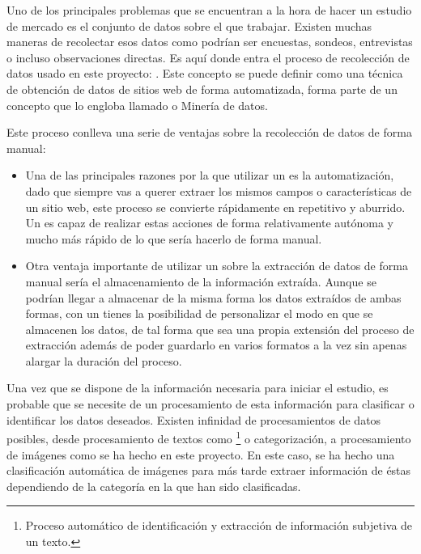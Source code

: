 
Uno de los principales problemas que se encuentran a la hora de hacer un estudio de mercado es el conjunto de datos sobre el que trabajar. Existen muchas maneras de recolectar esos datos como podrían ser encuestas, sondeos, entrevistas o incluso observaciones directas. Es aquí donde entra el proceso de recolección de datos usado en este proyecto: . Este concepto se puede definir como una técnica de obtención de datos de sitios web de forma automatizada, forma parte de un concepto que lo engloba llamado  o Minería de datos.

Este proceso conlleva una serie de ventajas sobre la recolección de datos de forma manual:

\begin{itemize}
	\item Una de las principales razones por la que utilizar un  es la automatización, dado que siempre vas a querer extraer los mismos campos o características de un sitio web, este proceso se convierte rápidamente en repetitivo y aburrido. Un  es capaz de realizar estas acciones de forma relativamente autónoma y mucho más rápido de lo que sería hacerlo de forma manual.
	\item Otra ventaja importante de utilizar un  sobre la extracción de datos de forma manual sería el almacenamiento de la información extraída. Aunque se podrían llegar a almacenar de la misma forma los datos extraídos de ambas formas, con un  tienes la posibilidad de personalizar el modo en que se almacenen los datos, de tal forma que sea una propia extensión del proceso de extracción además de poder guardarlo en varios formatos a la vez sin apenas alargar la duración del proceso.
\end{itemize}

Una vez que se dispone de la información necesaria para iniciar el estudio, es probable que se necesite de un procesamiento de esta información para clasificar o identificar los datos deseados. Existen infinidad de procesamientos de datos posibles, desde procesamiento de textos como \footnote{Proceso automático de identificación y extracción de información subjetiva de un texto.} o categorización, a procesamiento de imágenes como se ha hecho en este proyecto. En este caso, se ha hecho una clasificación automática de imágenes para más tarde extraer información de éstas dependiendo de la categoría en la que han sido clasificadas.
